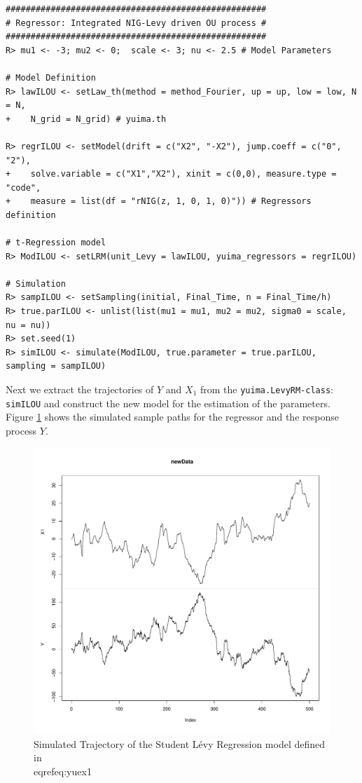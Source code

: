 \begin{verbatim}
####################################################
# Regressor: Integrated NIG-Levy driven OU process #
####################################################
R> mu1 <- -3; mu2 <- 0;  scale <- 3; nu <- 2.5 # Model Parameters

# Model Definition
R> lawILOU <- setLaw_th(method = method_Fourier, up = up, low = low, N = N,
+    N_grid = N_grid) # yuima.th

R> regrILOU <- setModel(drift = c("X2", "-X2"), jump.coeff = c("0", "2"),
+    solve.variable = c("X1","X2"), xinit = c(0,0), measure.type = "code",
+    measure = list(df = "rNIG(z, 1, 0, 1, 0)")) # Regressors definition

# t-Regression model
R> ModILOU <- setLRM(unit_Levy = lawILOU, yuima_regressors = regrILOU)

# Simulation
R> sampILOU <- setSampling(initial, Final_Time, n = Final_Time/h)
R> true.parILOU <- unlist(list(mu1 = mu1, mu2 = mu2, sigma0 = scale, nu = nu))
R> set.seed(1)
R> simILOU <- simulate(ModILOU, true.parameter = true.parILOU, sampling = sampILOU)
\end{verbatim}

Next we extract the trajectories of \(Y\) and \(X_{1}\) from the \texttt{yuima.LevyRM-class}: \texttt{simILOU} and construct the new model for the estimation of the parameters.
Figure \ref{fig:SimulationMod2} shows the simulated sample paths for the regressor and the response process \(Y\).

\begin{figure}

{\centering \includegraphics[width=1\linewidth]{figures/Simulation_Mod2} 

}

\caption{Simulated Trajectory of the Student Lévy Regression model defined in \\eqref{eq:yuex1}}\label{fig:SimulationMod2}
\end{figure}

